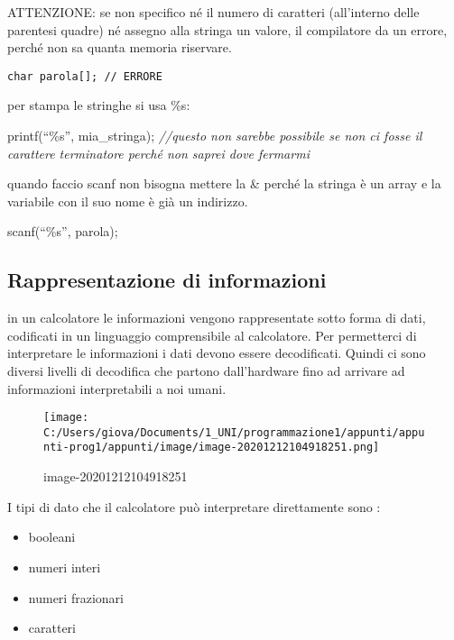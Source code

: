 \documentclass[
]{article}
\newenvironment{Shaded}{}{}
\newcommand{\CommentTok}[1]{\textcolor[rgb]{0.38,0.63,0.69}{\textit{#1}}}
\newcommand{\NormalTok}[1]{#1}
\begin{document}
ATTENZIONE: se non specifico né il numero di caratteri (all'interno
delle parentesi quadre) né assegno alla stringa un valore, il
compilatore da un errore, perché non sa quanta memoria riservare.

\begin{verbatim}
char parola[]; // ERRORE
\end{verbatim}

per stampa le stringhe si usa \%s:

\begin{Shaded}
\begin{Highlighting}[]
\NormalTok{printf(“\%s”, mia\_stringa); }\CommentTok{//questo non sarebbe possibile se non ci fosse il carattere terminatore perché non saprei dove fermarmi }
\end{Highlighting}
\end{Shaded}

quando faccio scanf non bisogna mettere la \& perché la stringa è un
array e la variabile con il suo nome è già un indirizzo.

\begin{Shaded}
\begin{Highlighting}[]
\NormalTok{scanf(“\%s”, parola);}
\end{Highlighting}
\end{Shaded}

\hypertarget{header-n480}{%
\subsection{Rappresentazione di informazioni}\label{header-n480}}

in un calcolatore le informazioni vengono rappresentate sotto forma di
dati, codificati in un linguaggio comprensibile al calcolatore. Per
permetterci di interpretare le informazioni i dati devono essere
decodificati. Quindi ci sono diversi livelli di decodifica che partono
dall'hardware fino ad arrivare ad informazioni interpretabili a noi
umani.

\begin{figure}
\centering
\texttt{[image: C:/Users/giova/Documents/1\_UNI/programmazione1/appunti/appunti-prog1/appunti/image/image-20201212104918251.png]}
\caption{image-20201212104918251}
\end{figure}

I tipi di dato che il calcolatore può interpretare direttamente sono :

\begin{itemize}
\item
  booleani
\item
  numeri interi
\item
  numeri frazionari
\item
  caratteri
\end{itemize}
\end{document}
